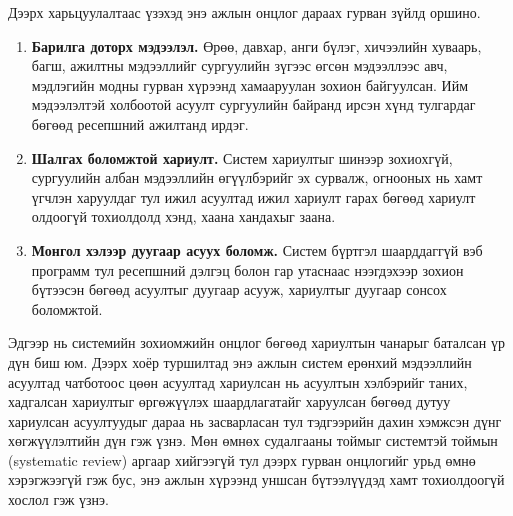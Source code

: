 Дээрх харьцуулалтаас үзэхэд энэ ажлын онцлог дараах гурван зүйлд оршино.
\begin{enumerate}
    \item \textbf{Барилга доторх мэдээлэл.} Өрөө, давхар, анги бүлэг, хичээлийн хуваарь, багш, ажилтны мэдээллийг сургуулийн зүгээс өгсөн мэдээллээс авч, мэдлэгийн модны гурван хүрээнд хамааруулан зохион байгуулсан. Ийм мэдээлэлтэй холбоотой асуулт сургуулийн байранд ирсэн хүнд тулгардаг бөгөөд ресепшний ажилтанд ирдэг.
    \item \textbf{Шалгах боломжтой хариулт.} Систем хариултыг шинээр зохиохгүй, сургуулийн албан мэдээллийн өгүүлбэрийг эх сурвалж, огнооных нь хамт үгчлэн харуулдаг тул ижил асуултад ижил хариулт гарах бөгөөд хариулт олдоогүй тохиолдолд хэнд, хаана хандахыг заана.
    \item \textbf{Монгол хэлээр дуугаар асуух боломж.} Систем бүртгэл шаарддаггүй вэб программ тул ресепшний дэлгэц болон гар утаснаас нээгдэхээр зохион бүтээсэн бөгөөд асуултыг дуугаар асууж, хариултыг дуугаар сонсох боломжтой.
\end{enumerate}

Эдгээр нь системийн зохиомжийн онцлог бөгөөд хариултын чанарыг баталсан үр дүн биш юм. Дээрх хоёр туршилтад энэ ажлын систем ерөнхий мэдээллийн асуултад чатботоос цөөн асуултад хариулсан нь асуултын хэлбэрийг таних, хадгалсан хариултыг өргөжүүлэх шаардлагатайг харуулсан бөгөөд дутуу хариулсан асуултуудыг дараа нь засварласан тул тэдгээрийн дахин хэмжсэн дүнг хөгжүүлэлтийн дүн гэж үзнэ. Мөн өмнөх судалгааны тоймыг системтэй тоймын (systematic review) аргаар хийгээгүй тул дээрх гурван онцлогийг урьд өмнө хэрэгжээгүй гэж бус, энэ ажлын хүрээнд уншсан бүтээлүүдэд хамт тохиолдоогүй хослол гэж үзнэ.

